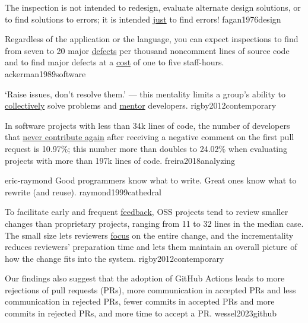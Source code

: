 \documentclass{article}
\begin{document}
  {The inspection is not intended to redesign, evaluate alternate design solutions, or to find solutions to errors; it is intended \ul{just} to find errors!}
  {fagan1976design}

  {Regardless of the application or the language, you can expect inspections to find from seven to 20 major \ul{defects} per thousand noncomment lines of source code and to find major defects at a \ul{cost} of one to five staff-hours.}
  {ackerman1989software}

  {`Raise issues, don't resolve them.' --- this mentality limits a group's ability to \ul{collectively} solve problems and \ul{mentor} developers.}
  {rigby2012contemporary}

  {In software projects with less than 34k lines of code, the number of developers that \ul{never contribute again} after receiving a negative comment on the first pull request is 10.97\%; this number more than doubles to 24.02\% when evaluating projects with more than 197k lines of code.}
  {freira2018analyzing}



\qte
  {eric-raymond}
  {Good programmers know what to write. Great ones know what to rewrite (and reuse).}
  {raymond1999cathedral}

  {To facilitate early and frequent \ul{feedback}, OSS projects tend to review smaller changes than proprietary projects, ranging from 11 to 32 lines in the median case. The small size lets reviewers \ul{focus} on the entire change, and the incrementality reduces reviewers’ preparation time and lets them maintain an overall picture of how the change fits into the system.}
  {rigby2012contemporary}




  {Our findings also suggest that the adoption of GitHub Actions leads to more rejections of pull requests (PRs), more communication in accepted PRs and less communication in rejected PRs, fewer commits in accepted PRs and more commits in rejected PRs, and more time to accept a PR.}
  {wessel2023github}
\end{document}
